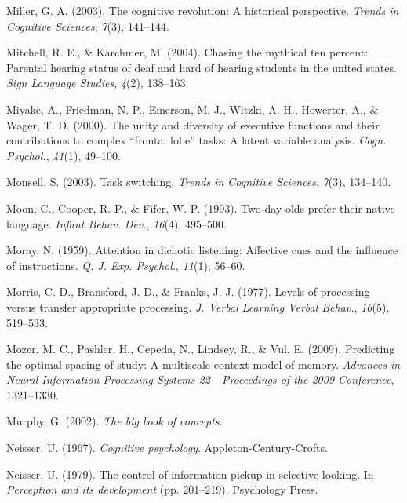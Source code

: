 \documentclass[
]{krantz}
\newlength{\cslhangindent}
\newenvironment{CSLReferences}[2] %
 {\begin{list}{}{%
  \setlength{\itemindent}{0pt}
  \setlength{\leftmargin}{0pt}
  \setlength{\parsep}{0pt}
  \ifodd #1
   \setlength{\leftmargin}{\cslhangindent}
   \setlength{\itemindent}{-1\cslhangindent}
  \fi
  \setlength{\itemsep}{#2\baselineskip}}}
 {\end{list}}
\begin{document}
\begin{CSLReferences}{1}{0}
Miller, G. A. (2003). The cognitive revolution: A historical perspective. \emph{Trends in Cognitive Sciences}, \emph{7}(3), 141--144.

Mitchell, R. E., \& Karchmer, M. (2004). Chasing the mythical ten percent: Parental hearing status of deaf and hard of hearing students in the united states. \emph{Sign Language Studies}, \emph{4}(2), 138--163.

Miyake, A., Friedman, N. P., Emerson, M. J., Witzki, A. H., Howerter, A., \& Wager, T. D. (2000). The unity and diversity of executive functions and their contributions to complex {``frontal lobe''} tasks: A latent variable analysis. \emph{Cogn. Psychol.}, \emph{41}(1), 49--100.

Monsell, S. (2003). Task switching. \emph{Trends in Cognitive Sciences}, \emph{7}(3), 134--140.

Moon, C., Cooper, R. P., \& Fifer, W. P. (1993). Two-day-olds prefer their native language. \emph{Infant Behav. Dev.}, \emph{16}(4), 495--500.

Moray, N. (1959). Attention in dichotic listening: Affective cues and the influence of instructions. \emph{Q. J. Exp. Psychol.}, \emph{11}(1), 56--60.

Morris, C. D., Bransford, J. D., \& Franks, J. J. (1977). Levels of processing versus transfer appropriate processing. \emph{J. Verbal Learning Verbal Behav.}, \emph{16}(5), 519--533.

Mozer, M. C., Pashler, H., Cepeda, N., Lindsey, R., \& Vul, E. (2009). Predicting the optimal spacing of study: A multiscale context model of memory. \emph{Advances in Neural Information Processing Systems 22 - Proceedings of the 2009 Conference}, 1321--1330.

Murphy, G. (2002). \emph{The big book of concepts}.

Neisser, U. (1967). \emph{Cognitive psychology}. Appleton-Century-Crofts.

Neisser, U. (1979). The control of information pickup in selective looking. In \emph{Perception and its development} (pp. 201--219). Psychology Press.


\end{CSLReferences}
\end{document}
